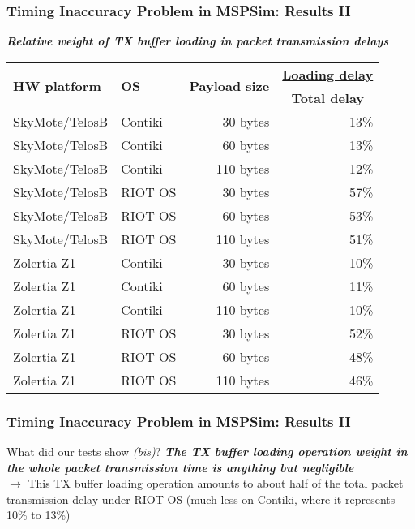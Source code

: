 \documentclass[10pt,c]{beamer}
\renewcommand{\emph}[1]{\textbf{\textit{#1}}}
\newcommand{\tblcaption}[1]{\textbf{\textsl{\small#1}}\vspace{0.1cm}}
\begin{document}
\begin{frame}
\frametitle{Timing Inaccuracy Problem in MSPSim: Results II}
\begin{center}
\tblcaption{Relative weight of TX buffer loading
            in packet transmission delays}

\begin{tabular}{|l|l|r|r|}
\hline
\multirow{2}{2.5cm}{\textbf{HW platform}}
 & \multirow{2}{1cm}{\textbf{OS}}
  & \multirow{2}{2cm}{\textbf{Payload size}}
     & \multicolumn{1}{|c|}{\textbf{\underline{Loading delay}}} \\
 & & & \multicolumn{1}{|c|}{\textbf{Total delay}} \\
\hline
SkyMote/TelosB & Contiki &  30 bytes & 13\% \\
SkyMote/TelosB & Contiki &  60 bytes & 13\% \\
SkyMote/TelosB & Contiki & 110 bytes & 12\% \\
\hline
SkyMote/TelosB & RIOT OS &  30 bytes & 57\% \\
SkyMote/TelosB & RIOT OS &  60 bytes & 53\% \\
SkyMote/TelosB & RIOT OS & 110 bytes & 51\% \\
\hline
Zolertia Z1    & Contiki &  30 bytes & 10\% \\
Zolertia Z1    & Contiki &  60 bytes & 11\% \\
Zolertia Z1    & Contiki & 110 bytes & 10\% \\
\hline
Zolertia Z1    & RIOT OS &  30 bytes & 52\% \\
Zolertia Z1    & RIOT OS &  60 bytes & 48\% \\
Zolertia Z1    & RIOT OS & 110 bytes & 46\% \\
\hline
\end{tabular}
\end{center}
\end{frame}

\begin{frame}
\frametitle{Timing Inaccuracy Problem in MSPSim: Results II}
\begin{block}{What did our tests show \textit{(bis)}?}
\emph{The TX buffer loading operation weight in the whole packet
transmission time is anything but negligible} \\
$\rightarrow$ This TX buffer loading operation amounts to about
half of the total packet transmission delay under RIOT OS
(much less on Contiki, where it represents 10\% to 13\%)
\end{block}
\end{frame}
\end{document}
